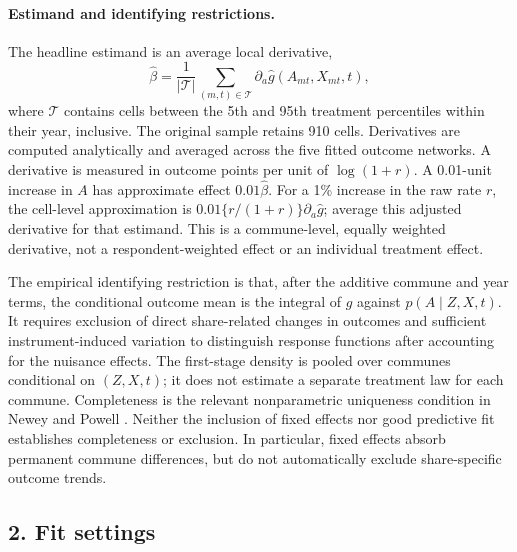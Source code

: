 \paragraph{Estimand and identifying restrictions.}
The headline estimand is an average local derivative,
\begin{equation}
\widehat\beta=\frac{1}{|\mathcal T|}
\sum_{(m,t)\in\mathcal T}\partial_a\widehat g(A_{mt},X_{mt},t),
\label{eq:neural-effect}
\end{equation}
where $\mathcal T$ contains cells between the 5th and 95th treatment percentiles within their year, inclusive. The original sample retains 910 cells. Derivatives are computed analytically and averaged across the five fitted outcome networks. A derivative is measured in outcome points per unit of $\log(1+r)$. A 0.01-unit increase in $A$ has approximate effect $0.01\widehat\beta$. For a 1\% increase in the raw rate $r$, the cell-level approximation is $0.01\{r/(1+r)\}\partial_a\widehat g$; average this adjusted derivative for that estimand. This is a commune-level, equally weighted derivative, not a respondent-weighted effect or an individual treatment effect.

The empirical identifying restriction is that, after the additive commune and year terms, the conditional outcome mean is the integral of $g$ against $p(A\mid Z,X,t)$. It requires exclusion of direct share-related changes in outcomes and sufficient instrument-induced variation to distinguish response functions after accounting for the nuisance effects. The first-stage density is pooled over communes conditional on $(Z,X,t)$; it does not estimate a separate treatment law for each commune. Completeness is the relevant nonparametric uniqueness condition in Newey and Powell \cite{neweypowell}. Neither the inclusion of fixed effects nor good predictive fit establishes completeness or exclusion. In particular, fixed effects absorb permanent commune differences, but do not automatically exclude share-specific outcome trends.

\subsection*{2. Fit settings}
